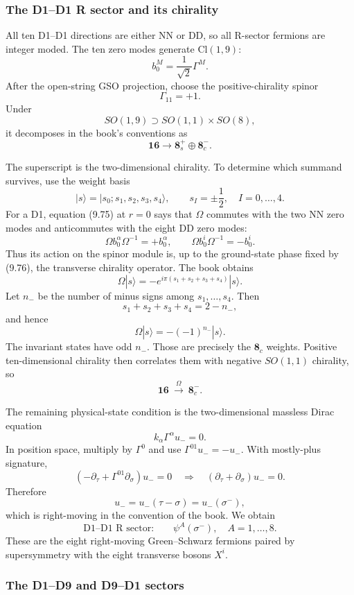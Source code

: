 \documentclass[
  10pt,
  a4paper,
  openany]{book}
\begin{document}
\subsubsection{The D1--D1 R sector and its
chirality}\label{the-d1d1-r-sector-and-its-chirality}

All ten D1--D1 directions are either NN or DD, so all R-sector fermions
are integer moded. The ten zero modes generate \(\mathrm{Cl}(1,9)\): \[
b_0^M
=\frac1{\sqrt2}\Gamma^M.
\] After the open-string GSO projection, choose the positive-chirality
spinor \[
\Gamma_{11}=+1.
\] Under \[
SO(1,9)
\supset
SO(1,1)\times SO(8),
\] it decomposes in the book's conventions as \[
\boxed{
\mathbf{16}
\longrightarrow
\mathbf 8_s^{+}\oplus\mathbf 8_c^{-}
}.
\]

The superscript is the two-dimensional chirality. To determine which
summand survives, use the weight basis \[
|s\rangle
=|s_0;s_1,s_2,s_3,s_4\rangle,
\qquad
s_I=\pm\frac12,
\quad I=0,\ldots,4.
\] For a D1, equation (9.75) at \(r=0\) says that \(\Omega\) commutes
with the two NN zero modes and anticommutes with the eight DD zero
modes: \[
\Omega b_0^\alpha\Omega^{-1}=+b_0^\alpha,
\qquad
\Omega b_0^i\Omega^{-1}=-b_0^i.
\] Thus its action on the spinor module is, up to the ground-state phase
fixed by (9.76), the transverse chirality operator. The book obtains \[
\Omega|s\rangle
=-e^{i\pi(s_1+s_2+s_3+s_4)}|s\rangle.
\] Let \(n_-\) be the number of minus signs among \(s_1,\ldots,s_4\).
Then \[
s_1+s_2+s_3+s_4
=2-n_-,
\] and hence \[
\Omega|s\rangle
=-(-1)^{n_-}|s\rangle.
\] The invariant states have odd \(n_-\). Those are precisely the
\(\mathbf 8_c\) weights. Positive ten-dimensional chirality then
correlates them with negative \(SO(1,1)\) chirality, so \[
\boxed{
\mathbf{16}
\ \xrightarrow{\ \Omega\ }\
\mathbf 8_c^{-}
}.
\]

The remaining physical-state condition is the two-dimensional massless
Dirac equation \[
k_\alpha\Gamma^\alpha u_-=0.
\] In position space, multiply by \(\Gamma^0\) and use
\(\Gamma^{01}u_-=-u_-\). With mostly-plus signature, \[
\left(
-\partial_\tau+\Gamma^{01}\partial_\sigma
\right)u_-=0
\quad\Longrightarrow\quad
\left(\partial_\tau+\partial_\sigma\right)u_-=0.
\] Therefore \[
u_-=u_-(\tau-\sigma)=u_-(\sigma^-),
\] which is right-moving in the convention of the book. We obtain \[
\boxed{
\text{D1--D1 R sector:}\qquad
\psi^A(\sigma^-),
\quad A=1,\ldots,8
}.
\] These are the eight right-moving Green--Schwarz fermions paired by
supersymmetry with the eight transverse bosons \(X^i\).

\subsubsection{The D1--D9 and D9--D1
sectors}\label{the-d1d9-and-d9d1-sectors}
\end{document}
